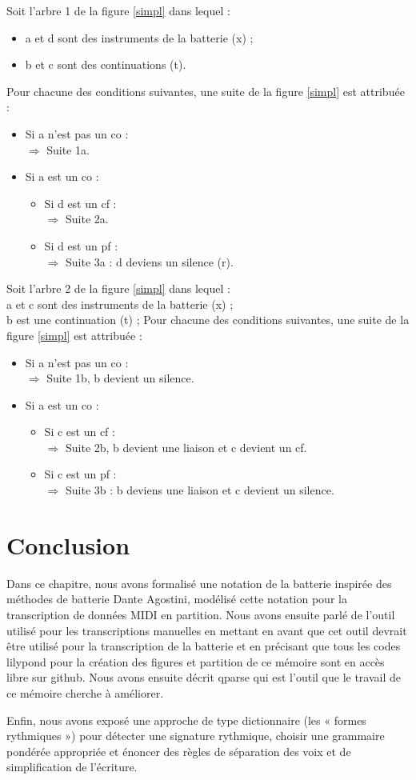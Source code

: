 Soit l’arbre 1 de la figure \ref{simpl} dans lequel :
\begin{itemize}
    \item a et d sont des instruments de la batterie (x) ;
    \item b et c sont des continuations (t).
\end{itemize}
Pour chacune des conditions suivantes, une suite de la
figure \ref{simpl} est attribuée :
\begin{itemize}
	\item Si a n’est pas un co :\\
	$\Rightarrow$ Suite 1a.
	\item Si a est un co :
	\begin{itemize}
		\item Si d est un cf :\\
		$\Rightarrow$ Suite 2a.
		\item Si d est un pf :\\
		$\Rightarrow$ Suite 3a : d deviens un silence (r).\\
	\end{itemize}
\end{itemize}
Soit l’arbre 2 de la figure \ref{simpl} dans lequel :\\
a et c sont des instruments de la batterie (x) ;\\
b est une continuation (t) ;
Pour chacune des conditions suivantes, une suite de la figure \ref{simpl} est
attribuée :
\begin{itemize}
	\item Si a n’est pas un co :\\
	$\Rightarrow$ Suite 1b, b devient un silence.
	\item Si a est un co :
	\begin{itemize}
		\item Si c est un cf :\\
		$\Rightarrow$ Suite 2b, b devient une liaison et c devient un cf.
		\item Si c est un pf :\\
		$\Rightarrow$ Suite 3b : b deviens une liaison et c devient un silence.
	\end{itemize}
\end{itemize}

\section*{Conclusion}
Dans ce chapitre, nous avons formalisé une notation de la batterie inspirée des
méthodes de batterie Dante Agostini, modélisé cette notation pour
la transcription de données MIDI en partition.
Nous avons ensuite parlé de l’outil utilisé pour les transcriptions manuelles
en mettant en avant que cet outil devrait être utilisé pour la transcription de
la batterie et en précisant que tous les codes lilypond pour la création des
figures et partition de ce mémoire sont en accès libre sur github. Nous avons
ensuite décrit qparse qui est l’outil que le travail de ce mémoire cherche à
améliorer.

Enfin, nous avons exposé une approche de type dictionnaire (les « formes
rythmiques ») pour détecter une signature rythmique, choisir une grammaire
pondérée appropriée et énoncer des règles de séparation des voix et de
simplification de l’écriture.
